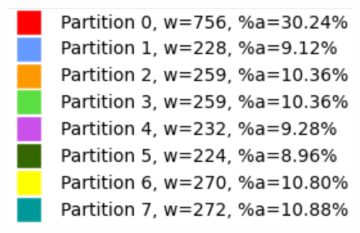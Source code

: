 \vspace{8mm}
\begin{figure}[h]
\centering
\begin{subfigure}{.33\textwidth}
    \centering
    \caption[short]{}
\end{subfigure}%
\begin{subfigure}{.33\textwidth}
    \centering
    \caption[short]{}
\end{subfigure}%
\begin{subfigure}{.33\textwidth}
    \centering
    \includegraphics[width=0.9\linewidth]{images/results/m_k/with/5/results}

\end{subfigure}
\end{figure}
